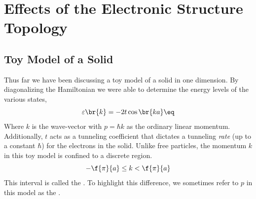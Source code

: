 \documentclass{article}
\begin{document}
\titlePage

\tableOfContents

\disclaimer

\section{Effects of the Electronic Structure Topology}

\subsection{Toy Model of a Solid}


\begin{center}
\end{center}


Thus far we have been discussing a toy model of a solid in one dimension. By diagonalizing the Hamiltonian we were able to determine the energy levels of the various states,
\[ \varepsilon\br{k} = - 2 t \cos\br{ka} \eq \label{eq:single_energy__band}\]
Where $k$ is the wave-vector with $p = \hbar k$ as the ordinary linear momentum. Additionally, $t$ acts as a tunneling coefficient that dictates a tunneling \textit{rate} (up to a constant $\hbar$) for the electrons in the solid. Unlike free particles, the momentum $k$ in this toy model is confined to a discrete region.
\[ -\f{\pi}{a} \leq k < \f{\pi}{a} \]
This interval is called the .
To highlight this difference, we sometimes refer to $p$ in this model as the .\\
\end{document}
